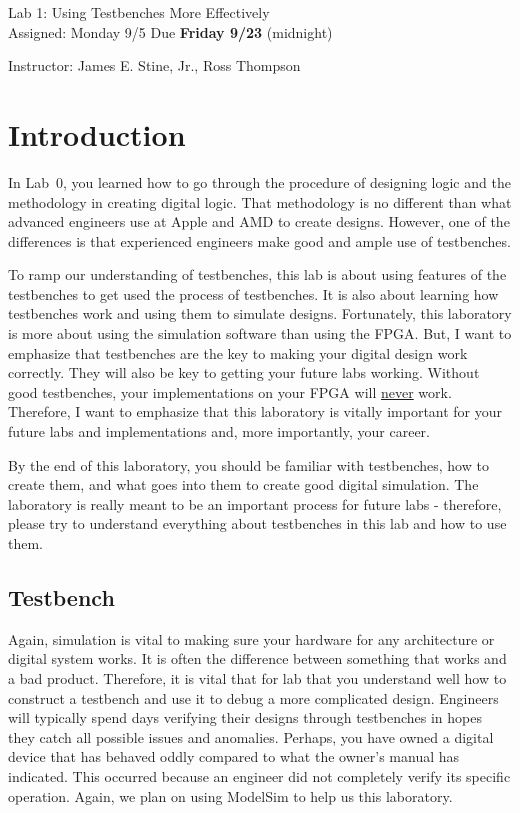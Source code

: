 \documentclass{article}
\newcommand{\myassignment}{Lab 1: Using Testbenches More Effectively}
\newcommand{\myduedate}{Assigned: Monday 9/5 Due \textbf{Friday 9/23} (midnight)}
\newcommand{\myinstructor}{Instructor: James E. Stine, Jr., Ross Thompson}
\begin{document}
\begin{center}
  {\huge \myassignment} \\
  {\large \myduedate} \\
  \begin{flushright}
  \myinstructor \\
  \end{flushright}
\end{center}

\section{Introduction}

In Lab~$0$, you learned how to go through the procedure of
designing logic and the methodology in creating digital logic.  That
methodology is no different than what advanced engineers use at Apple
and AMD to create designs.  However, one of the differences is that experienced
engineers make good and ample use of testbenches.

To ramp our understanding of testbenches, this lab is about using
features of the testbenches to get used the process of
testbenches.  It is also about learning how testbenches work and using
them to simulate designs.  Fortunately, this laboratory is more about using the
simulation software than using the FPGA.  But, I want to emphasize
that testbenches are the key to making your digital design work
correctly.  They will also
be key to getting your future labs working.  Without good
testbenches, your implementations on your FPGA will \underline{never} work.
Therefore, I want to emphasize that this laboratory is vitally important for
your future labs and implementations and, more importantly, your career.

By the end of this laboratory, you should be
familiar with testbenches, how to create them, and what goes into them
to create good digital simulation.  The laboratory is really meant to
be an important process for future labs - therefore, please
try to understand everything about testbenches in this lab and how to
use them.

\subsection{Testbench}

Again, simulation is vital to making sure your hardware for any
architecture or
digital system works.  It is often the difference between something
that works and a bad product.  Therefore, it is
vital that for lab that you understand well how to construct a
testbench and use it to debug a more complicated design.
Engineers will typically spend days verifying their designs through
testbenches in hopes they catch all possible issues and anomalies.
Perhaps, you have owned a digital device that has behaved oddly
compared to what the owner's manual has indicated.  This occurred
because an engineer did not completely verify its specific operation.
Again, we plan on using ModelSim to help us this laboratory.
\end{document}
